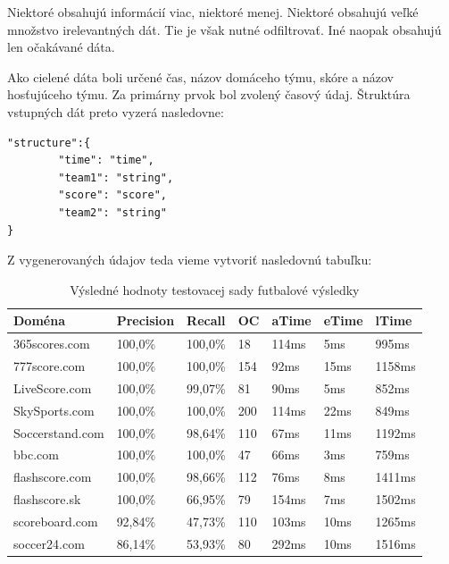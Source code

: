 Niektoré obsahujú informácií viac, niektoré menej. Niektoré obsahujú veľké množstvo irelevantných dát. Tie je však nutné odfiltrovať. Iné naopak obsahujú len očakávané dáta.

\bigskip

Ako cielené dáta boli určené čas, názov domáceho týmu, skóre a názov hosťujúceho týmu. Za primárny prvok bol zvolený časový údaj. Štruktúra vstupných dát preto vyzerá nasledovne:

\bigskip

\begin{lstlisting}
"structure":{
        "time": "time",
        "team1": "string",
        "score": "score",
        "team2": "string"
}
\end{lstlisting}

\bigskip

Z vygenerovaných údajov teda vieme vytvoriť nasledovnú tabuľku:

\begin{table}[hbt]
\caption{Výsledné hodnoty testovacej sady futbalové výsledky}
\centering
\begin{tabular}{|l|l|l|l|l|l|l|}
\hline
Doména          & Precision & Recall  & OC  & aTime & eTime & lTime  \\ \hline
365scores.com   & 100,0\%   & 100,0\% & 18  & 114ms & 5ms   & 995ms  \\ \hline
777score.com    & 100,0\%   & 100,0\% & 154 & 92ms  & 15ms  & 1158ms \\ \hline
LiveScore.com   & 100,0\%   & 99,07\% & 81  & 90ms  & 5ms   & 852ms  \\ \hline
SkySports.com   & 100,0\%   & 100,0\% & 200 & 114ms & 22ms  & 849ms  \\ \hline
Soccerstand.com & 100,0\%   & 98,64\% & 110 & 67ms  & 11ms  & 1192ms \\ \hline
bbc.com         & 100,0\%   & 100,0\% & 47  & 66ms  & 3ms   & 759ms  \\ \hline
flashscore.com  & 100,0\%   & 98,66\% & 112 & 76ms  & 8ms   & 1411ms \\ \hline
flashscore.sk   & 100,0\%   & 66,95\% & 79  & 154ms & 7ms   & 1502ms \\ \hline
scoreboard.com  & 92,84\%   & 47,73\% & 110 & 103ms & 10ms  & 1265ms \\ \hline
soccer24.com    & 86,14\%   & 53,93\% & 80  & 292ms & 10ms  & 1516ms \\ \hline
\end{tabular}
\end{table}

